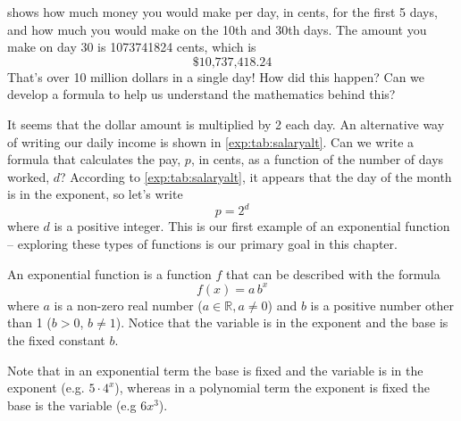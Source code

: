 \begin{pccexample}
	 shows how much money you would make per day, 
	in cents, for the first 5 days, and how much you would make on the 10th and 30th days. 
	The amount you make on day 30 is 1073741824 cents, which is
	\[
		\$10\textrm{,}737\textrm{,}418.24   
	\]
	That's over 10 million dollars in a single day! How did this happen? Can we develop 
	a formula to help us understand the mathematics behind this? 
							
	It seems that the dollar amount is multiplied by 2 each day. An alternative way 
	of writing our daily income is shown in \cref{exp:tab:salaryalt}. Can we write 
	a formula that calculates the pay, $p$, in cents, as a function of the number of days
	worked, $d$? 
	According to \cref{exp:tab:salaryalt}, it appears that the day of the month is in the exponent, 
	so let's write
	\[
		p = 2^{d}
	\]
	where $d$ is a positive integer. This is our first example of an exponential function -- exploring 
	these types of functions is our primary goal in this chapter.
\end{pccexample}
\begin{pccdefinition}
	An exponential function is a function $f$ that can be described with the formula 
	\[
		f(x)=a\,b^x
	\] 
	where $a$ is a non-zero real number ($a\in\mathbb{R}, a\ne 0$) and $b$ is a positive 
	number other than 1 ($b>0$, $b\neq1$). Notice that the variable is in the exponent 
	and the base is the fixed constant $b$.
							
	Note that in an exponential term the base is fixed and the variable is in the 
	exponent (e.g. $5\cdot 4^x$), whereas in a polynomial term the exponent is fixed the base is the variable (e.g $6x^3$).
\end{pccdefinition}

